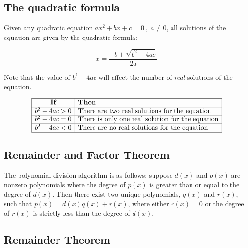 \subsection{The quadratic formula}
\label{sss:theq-f874}




Given any quadratic equation $ax^2+bx+c=0\ ,\ a\ne0$, all solutions of the equation are
given by the quadratic formula:



$$x=\frac{-b \pm \sqrt{b^2 - 4ac} }{2a}$$



Note that the value of $b^2-4ac$ will affect the number of \textit{real} solutions of the equation.



$$\begin{array}{|c|l|}
\hline
\textbf{If} & \textbf{Then} \\ 
\hline
b^2 - 4ac > 0 & \text{There are two real solutions for the equation} \\ 
\hline
b^2 - 4ac = 0 & \text{There is only one real solution for the equation} \\ 
\hline
b^2 - 4ac < 0 & \text{There are no real solutions for the equation} \\ 
\hline 
\end{array}$$




\subsection{Remainder and Factor Theorem}
\label{sss:rema-cd36}




The polynomial division algorithm is as follows: suppose $d(x)$ and $p(x)$ are nonzero
polynomials where the degree of $p(x)$ is greater than or equal to the degree of $d(x)$.
Then there exist two unique polynomials, $q(x)$ and $r(x)$, such that $p(x) = d(x)q(x) +
r(x)$, where either $r(x) = 0$ or the degree of $r(x)$ is strictly less than the degree of
$d(x)$.




\subsection{Remainder Theorem}
\label{sss:rema-0f44}




